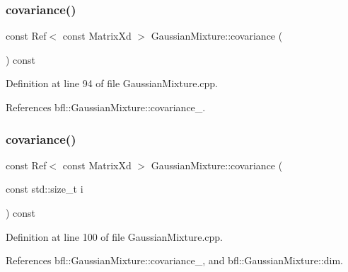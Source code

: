 \subsubsection{\texorpdfstring{covariance()}{covariance()}\hspace{0.1cm}{\footnotesize\ttfamily [4/6]}}
{\footnotesize\ttfamily const Ref$<$ const Matrix\+Xd $>$ Gaussian\+Mixture\+::covariance (\begin{DoxyParamCaption}{ }\end{DoxyParamCaption}) const\hspace{0.3cm}{\ttfamily [inherited]}}



Definition at line 94 of file Gaussian\+Mixture.\+cpp.



References bfl\+::\+Gaussian\+Mixture\+::covariance\+\_\+.

\mbox{\label{classbfl_1_1GaussianMixture_a3cff0f507ed950fe6a5e0aba1bf8467a}} 
\subsubsection{\texorpdfstring{covariance()}{covariance()}\hspace{0.1cm}{\footnotesize\ttfamily [5/6]}}
{\footnotesize\ttfamily const Ref$<$ const Matrix\+Xd $>$ Gaussian\+Mixture\+::covariance (\begin{DoxyParamCaption}\item[{const std\+::size\+\_\+t}]{i }\end{DoxyParamCaption}) const\hspace{0.3cm}{\ttfamily [inherited]}}



Definition at line 100 of file Gaussian\+Mixture.\+cpp.



References bfl\+::\+Gaussian\+Mixture\+::covariance\+\_\+, and bfl\+::\+Gaussian\+Mixture\+::dim.

\mbox{\label{classbfl_1_1GaussianMixture_a4ca0b098be0fc923f454e73e9dccf78f}} 
